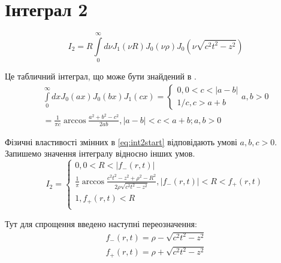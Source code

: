 \section{Інтеграл 2} \label{sec:i2anal}
%
\begin{equation} \label{eq:int2start}
I_2 = R \int \limits_{0}^{\infty} d \nu J_1 \left( \nu R \right) 
J_0 \left( \nu \rho \right) J_0 \left( \nu \sqrt{c^2t^2 - z^2} \right)
\end{equation}

Це табличний інтеграл, що може бути знайдений в 
\cite[ст. 228]{imp:SpecFunc1983}.
%
\begin{equation} \begin{aligned} \label{eq:intJ0J0J1tabel}
\int \limits_{0}^{\infty} d x J_0 \left( ax \right) 
J_0 \left( bx \right) J_1 \left( cx \right) = \begin{cases}
0, 0 < c < | a - b | \\ 
1/c, c > a + b
\end{cases} a, b > 0 \\
= \frac{1}{\pi c} \arccos \frac{a^2 + b^2 - c^2}{2ab},
| a - b | < c < a + b; a,b > 0
\end{aligned} \end{equation}

Фізичні властивості змінних в \eqref{eq:int2start} відповідають умові 
$ a,b,c > 0 $. Запишемо значення інтегралу відносно інших умов.
%
\begin{equation}
I_2 = \begin{cases}
0, 0 < R < | f_{-} \left( r, t \right) | \\
\frac{1}{\pi} \arccos \frac{c^2t^2 - z^2 + \rho^2 - R^2}
{2 \rho \sqrt{c^2t^2 - z^2}}, | f_{-} \left( r, t \right) | < R < 
f_{+} \left( r, t \right) \\ 1, f_{+} \left( r, t \right) < R \\
\end{cases}
\end{equation}

Тут для спрощення введено наступні переозначення:
%
\begin{equation*} \begin{aligned}
f_{-} \left( r, t \right) = \rho - \sqrt{c^2t^2 - z^2} \\
f_{+} \left( r, t \right) = \rho + \sqrt{c^2t^2 - z^2}
\end{aligned} \end{equation*}

